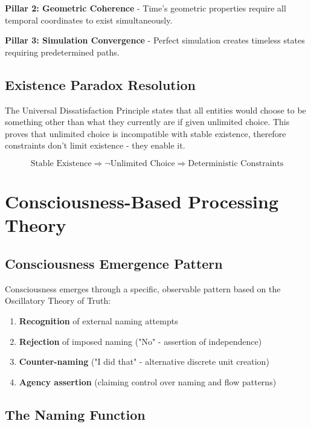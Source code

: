 \documentclass[12pt,a4paper]{article}
\begin{document}
\textbf{Pillar 2: Geometric Coherence} - Time's geometric properties require all temporal coordinates to exist simultaneously.

\textbf{Pillar 3: Simulation Convergence} - Perfect simulation creates timeless states requiring predetermined paths.

\subsection{Existence Paradox Resolution}

The Universal Dissatisfaction Principle states that all entities would choose to be something other than what they currently are if given unlimited choice. This proves that unlimited choice is incompatible with stable existence, therefore constraints don't limit existence - they enable it.

\begin{equation}
\text{Stable Existence} \Rightarrow \neg\text{Unlimited Choice} \Rightarrow \text{Deterministic Constraints}
\end{equation}

\section{Consciousness-Based Processing Theory}

\subsection{Consciousness Emergence Pattern}

Consciousness emerges through a specific, observable pattern based on the Oscillatory Theory of Truth:

\begin{enumerate}
\item \textbf{Recognition} of external naming attempts
\item \textbf{Rejection} of imposed naming ("No" - assertion of independence)  
\item \textbf{Counter-naming} ("I did that" - alternative discrete unit creation)
\item \textbf{Agency assertion} (claiming control over naming and flow patterns)
\end{enumerate}

\subsection{The Naming Function}
\end{document}
